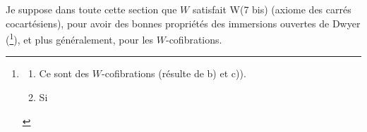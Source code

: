 \documentclass[11pt]{article}
\begin{document}
{\reversemarginpar\marginnote{\textbar\textbar\textbar}}Je suppose dans toute cette section que $W$ satisfait W(7 bis) (axiome des carrés cocartésiens), pour avoir des bonnes propriétés des immersions ouvertes de Dwyer (\footnote[124]{\begin{enumerate}
\item[a)] Ce sont des $W$-cofibrations (résulte de b) et c)).
\item[b)] Si
\end{enumerate}}), et plus généralement, pour les $W$-cofibrations. %
\end{document}
